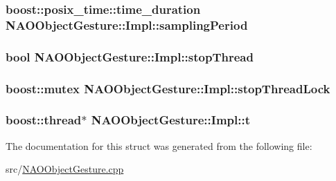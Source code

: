 \hypertarget{structNAOObjectGesture_1_1Impl_a35d282f450e7e82af06e879e532ce82b}{
\subsubsection[{sampling\-Period}]{\setlength{\rightskip}{0pt plus 5cm}boost\-::posix\-\_\-time\-::time\-\_\-duration {\bf \-N\-A\-O\-Object\-Gesture\-::\-Impl\-::sampling\-Period}}}\label{structNAOObjectGesture_1_1Impl_a35d282f450e7e82af06e879e532ce82b}
\hypertarget{structNAOObjectGesture_1_1Impl_a907f6e211036b7a4fd74b256c8523001}{
\subsubsection[{stop\-Thread}]{\setlength{\rightskip}{0pt plus 5cm}bool {\bf \-N\-A\-O\-Object\-Gesture\-::\-Impl\-::stop\-Thread}}}\label{structNAOObjectGesture_1_1Impl_a907f6e211036b7a4fd74b256c8523001}
\hypertarget{structNAOObjectGesture_1_1Impl_aa5dbfa4b4c3cd19df394fcdb8d46d391}{
\subsubsection[{stop\-Thread\-Lock}]{\setlength{\rightskip}{0pt plus 5cm}boost\-::mutex {\bf \-N\-A\-O\-Object\-Gesture\-::\-Impl\-::stop\-Thread\-Lock}}}\label{structNAOObjectGesture_1_1Impl_aa5dbfa4b4c3cd19df394fcdb8d46d391}
\hypertarget{structNAOObjectGesture_1_1Impl_a2820b7bbb1a1bda38095618a2f34d71a}{
\subsubsection[{t}]{\setlength{\rightskip}{0pt plus 5cm}boost\-::thread$\ast$ {\bf \-N\-A\-O\-Object\-Gesture\-::\-Impl\-::t}}}\label{structNAOObjectGesture_1_1Impl_a2820b7bbb1a1bda38095618a2f34d71a}


\-The documentation for this struct was generated from the following file\-:\begin{DoxyCompactItemize}
\item 
src/\hyperlink{NAOObjectGesture_8cpp}{\-N\-A\-O\-Object\-Gesture.\-cpp}\end{DoxyCompactItemize}
